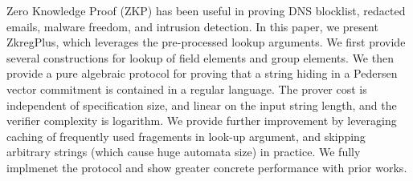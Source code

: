 Zero Knowledge Proof (ZKP) has been useful in proving
DNS blocklist, redacted emails, malware freedom, and
intrusion detection. In this paper, we present ZkregPlus,
which leverages the pre-processed lookup arguments.
We first provide several constructions for
lookup of field elements and group elements.
We then provide a pure algebraic protocol
for proving that a string hiding in a Pedersen
vector commitment is contained in a regular language.
The prover cost is independent of specification size,
and linear on the input string length, and
the verifier complexity is logarithm.
We provide further improvement by leveraging caching
of frequently used fragements in look-up argument,
and skipping arbitrary strings (which cause huge
automata size) in practice. We fully implmenet
the protocol and show greater concrete performance
with prior works.
